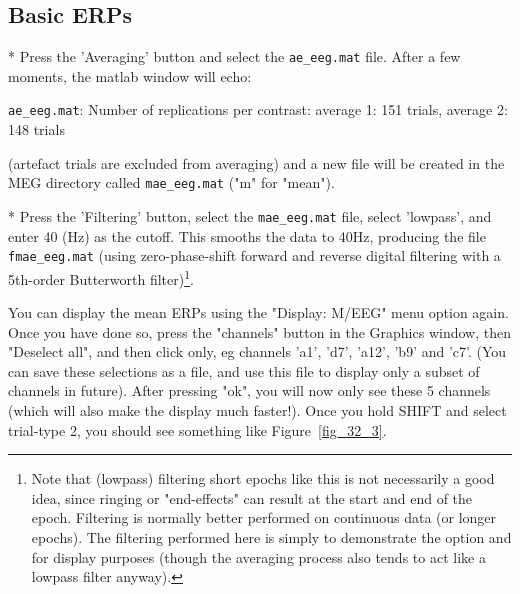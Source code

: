 \subsection{Basic ERPs}

* Press the 'Averaging' button and select the \verb!ae_eeg.mat! file. After a few moments, the matlab window will echo:

    \verb!ae_eeg.mat!: Number of replications per contrast:
    average 1: 151 trials, average 2: 148 trials

    (artefact trials are excluded from averaging) and a new file will be created in     the MEG directory called \verb!mae_eeg.mat! ("m" for "mean").

* Press the 'Filtering' button, select the \verb!mae_eeg.mat! file, select 'lowpass', and enter 40 (Hz) as the cutoff. This smooths the data to 40Hz, producing the file \verb!fmae_eeg.mat! (using zero-phase-shift forward and reverse digital filtering with a 5th-order Butterworth filter)\footnote{Note that (lowpass) filtering short epochs like this is not necessarily a good idea, since ringing or "end-effects" can result at the start and end of the epoch. Filtering is normally better performed on continuous data (or longer epochs). The filtering performed here is simply to demonstrate the option and for display purposes (though the averaging process also tends to act like a lowpass filter anyway).}.

You can display the mean ERPs using the "Display: M/EEG" menu option again. Once you have done so, press the "channels" button in the Graphics window, then "Deselect all", and then click only, eg channels 'a1', 'd7', 'a12', 'b9' and 'c7'. (You can save these selections as a file, and use this file to display only a subset of channels in future). After pressing "ok", you will now only see these 5 channels (which will also make the display much faster!). Once you hold SHIFT and select trial-type 2, you should see something like Figure~\ref{fig_32_3}.

